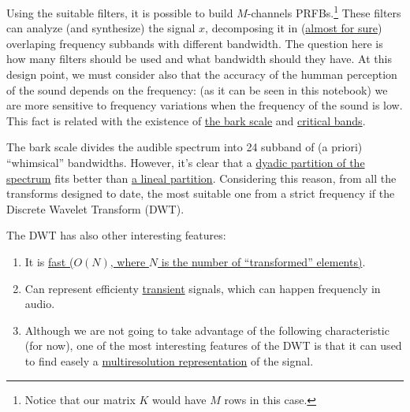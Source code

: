 Using the suitable filters, it is possible to build $M$-channels
PRFBs.\footnote{Notice that our matrix $K$ would have $M$ rows in this
  case.} These filters can analyze (and synthesize) the signal $x$,
decomposing it in
(\href{https://en.wikipedia.org/wiki/Low-pass_filter#Ideal_and_real_filters}{almost
  for sure}) overlaping frequency subbands with different
bandwidth. The question here is how many filters should be used and
what bandwidth should they have. At this design point, we must
consider also that the accuracy of the humman perception of the sound
depends on the frequency: (as it can be seen in this notebook) we are
more sensitive to frequency variations when the frequency of the sound
is low. This fact is related with the existence of
\href{https://en.wikipedia.org/wiki/Bark_scale}{the bark scale} and
\href{https://en.wikipedia.org/wiki/Critical_band}{critical bands}.

The bark scale divides the audible spectrum into 24 subband of (a
priori) ``whimsical'' bandwidths. However, it's clear that a
\href{https://en.wikipedia.org/wiki/Octave_band}{dyadic partition of
  the spectrum} fits better than
\href{https://en.wikipedia.org/wiki/Wavelet_transform#Principle}{a
  lineal partition}. Considering this reason, from all the transforms
designed to date, the most suitable one from a strict frequency if the
Discrete Wavelet Transform (DWT).

The DWT has also other interesting features:
\begin{enumerate}
\item It is
  \href{https://en.wikipedia.org/wiki/Discrete_wavelet_transform#Time_complexity}{fast
    ($O(N)$, where $N$ is the number of ``transformed'' elements)}.
\item Can represent efficienty
  \href{https://en.wikipedia.org/wiki/Transient_(oscillation)}{transient}
  signals, which can happen frequencly in audio.
\item Although we are not going to take advantage of the following
  characteristic (for now), one of the most interesting features of
  the DWT is that it can used to find easely a
  \href{https://en.wikipedia.org/wiki/Multiresolution_analysis}{multiresolution
    representation} of the signal.
\end{enumerate}

